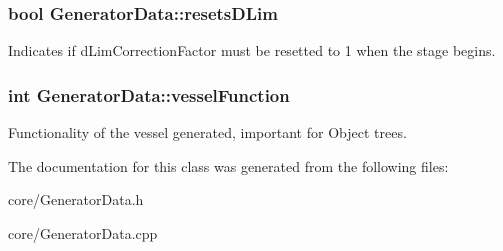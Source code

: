 \subsubsection[{\texorpdfstring{resets\+D\+Lim}{resetsDLim}}]{\setlength{\rightskip}{0pt plus 5cm}bool Generator\+Data\+::resets\+D\+Lim}\hypertarget{class_generator_data_ac246df2ff7ec145d0c33e3cfe105c82b}{}\label{class_generator_data_ac246df2ff7ec145d0c33e3cfe105c82b}
Indicates if d\+Lim\+Correction\+Factor must be resetted to 1 when the stage begins. 
\subsubsection[{\texorpdfstring{vessel\+Function}{vesselFunction}}]{\setlength{\rightskip}{0pt plus 5cm}int Generator\+Data\+::vessel\+Function}\hypertarget{class_generator_data_aaba3940733d99f383a09279694885dfd}{}\label{class_generator_data_aaba3940733d99f383a09279694885dfd}
Functionality of the vessel generated, important for Object trees. 

The documentation for this class was generated from the following files\+:\begin{DoxyCompactItemize}
\item 
core/Generator\+Data.\+h\item 
core/Generator\+Data.\+cpp\end{DoxyCompactItemize}
